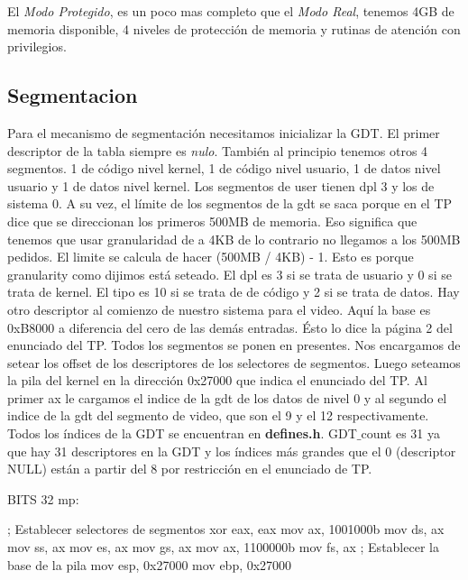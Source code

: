 El \textit{Modo Protegido}, es un poco mas completo que el \textit{Modo Real}, tenemos 4GB de memoria disponible, 4 niveles de protecci\'on de memoria y rutinas de atenci\'on con privilegios.

\subsection{Segmentacion}
Para el mecanismo de segmentación necesitamos inicializar la GDT.
El primer descriptor de la tabla siempre es \textit{nulo}. También al principio tenemos otros 4 segmentos. 1 de código nivel kernel, 1 de código nivel usuario, 1 de datos nivel usuario y 1 de datos nivel kernel. Los segmentos de user tienen dpl 3 y los de sistema 0. A su vez, el límite de los segmentos de la gdt se saca porque en el TP dice que se direccionan los primeros 500MB de memoria. Eso significa que tenemos que usar granularidad de a 4KB de lo contrario no llegamos a los 500MB pedidos. El limite se calcula de hacer (500MB / 4KB) - 1. Esto es porque granularity como dijimos está seteado. El dpl es 3 si se trata de usuario y 0 si se trata de kernel. El tipo es 10 si se trata de  de código y 2 si se trata de datos. Hay otro descriptor al comienzo de nuestro sistema para el video. Aquí la base es 0xB8000 a diferencia del cero de las demás entradas. Ésto lo dice la página 2 del enunciado del TP. Todos los segmentos se ponen en presentes.
\newline
Nos encargamos de setear los offset de los descriptores de los selectores de segmentos. Luego seteamos la pila del kernel en la direcci\'on 0x27000 que indica el enunciado del TP. Al primer ax le cargamos el indice de la gdt de los datos de nivel 0 y al segundo el indice de la gdt del segmento de video, que son el 9 y el 12 respectivamente.
Todos los índices de la GDT se encuentran en \textbf{defines.h}. GDT$\_$count es 31 ya que hay 31 descriptores en la GDT y los índices más grandes que el 0 (descriptor NULL) están a partir del 8 por restricción en el enunciado de TP.

\begin{algorithmic}
\State \tab BITS 32
\State \tab mp:

    \State \tab \tab ; Establecer selectores de segmentos
    \State \tab \tab xor eax, eax
    \State \tab \tab  mov ax, 1001000b
    \State \tab \tab  mov ds, ax
    \State \tab \tab  mov ss, ax
    \State \tab \tab  mov es, ax
    \State \tab \tab  mov gs, ax
    \State \tab \tab  mov ax, 1100000b
    \State \tab \tab  mov fs, ax
    \State \tab \tab  ; Establecer la base de la pila
    \State \tab \tab  mov esp, 0x27000
    \State \tab \tab  mov ebp, 0x27000
\end{algorithmic}

